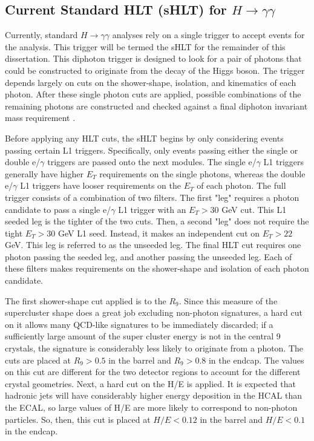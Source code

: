 \documentclass[12pt]{ucsddissertation}
\begin{document}
\subsection{Current Standard HLT (sHLT) for $H \rightarrow \gamma \gamma$} \label{sec:sHLT}

Currently, standard $H \rightarrow \gamma \gamma$ analyses rely on a single trigger to accept events for the analysis. This trigger will be termed the sHLT for the remainder of this dissertation. This diphoton trigger is designed to look for a pair of photons that could be constructed to originate from the decay of the Higgs boson. The trigger depends largely on cuts on the shower-shape, isolation, and kinematics of each photon. After these single photon cuts are applied, possible combinations of the remaining photons are constructed and checked against a final diphoton invariant mass requirement \cite{Run3Hgg2025}. 

Before applying any HLT cuts, the sHLT begins by only considering events passing certain L1 triggers. Specifically, only events passing either the single or double e/$\gamma$ triggers are passed onto the next modules. The single e/$\gamma$ L1 triggers generally have higher $E_T$ requirements on the single photons, whereas the double e/$\gamma$ L1 triggers have looser requirements on the $E_T$ of each photon. The full trigger consists of a combination of two filters. The first "leg" requires a photon candidate to pass a single e/$\gamma$ L1 trigger with an $E_T > 30$ GeV cut. This L1 seeded leg is the tighter of the two cuts. Then, a second "leg" does not require the tight $E_T > 30$ GeV L1 seed. Instead, it makes an independent cut on $E_T > 22$ GeV. This leg is referred to as the unseeded leg. The final HLT cut requires one photon passing the seeded leg, and another passing the unseeded leg. Each of these filters makes requirements on the shower-shape and isolation of each photon candidate.

The first shower-shape cut applied is to the $R_9$. Since this measure of the supercluster shape does a great job excluding non-photon signatures, a hard cut on it allows many QCD-like signatures to be immediately discarded; if a sufficiently large amount of the super cluster energy is not in the central 9 crystals, the signature is considerably less likely to originate from a photon. The cuts are placed at $R_9 > 0.5$ in the barrel and $R_9 > 0.8$ in the endcap. The values on this cut are different for the two detector regions to account for the different crystal geometries. Next, a hard cut on the H/E is applied. It is expected that hadronic jets will have considerably higher energy deposition in the HCAL than the ECAL, so large values of H/E are more likely to correspond to non-photon particles. So, then, this cut is placed at $H/E < 0.12$ in the barrel and $H/E < 0.1$ in the endcap. 
\end{document}
